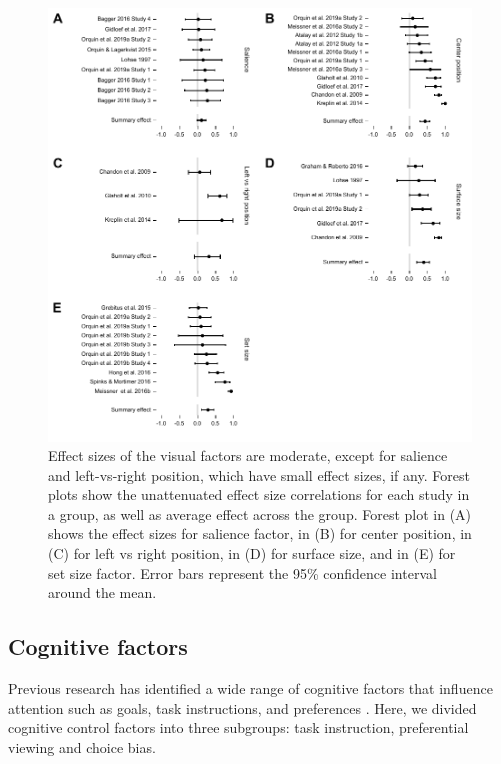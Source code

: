 \documentclass[english,natbib,man,floatsintext]{apa6}
\begin{document}
\begin{figure}%
\includegraphics{forest_plots_visual}
\centering
\caption{Effect sizes of the visual factors are moderate, except for salience and left-vs-right position, which have small effect sizes, if any. Forest plots show the unattenuated effect size correlations for each study in a group, as well as average effect across the group. Forest plot in (A) shows the effect sizes for salience factor, in (B) for center position, in (C) for left vs right position, in  (D) for surface size, and in (E) for set size factor. Error bars represent the 95\% confidence interval around the mean.}
\label{fig:forest_plots_visual}
\end{figure}


\subsection{Cognitive factors}
Previous research has identified a wide range of cognitive factors that influence attention such as goals, task instructions, and preferences \citep[for a review see][]{orquin2013a}. Here, we divided cognitive control factors into three subgroups: task instruction, preferential viewing and choice bias. 
\end{document}
